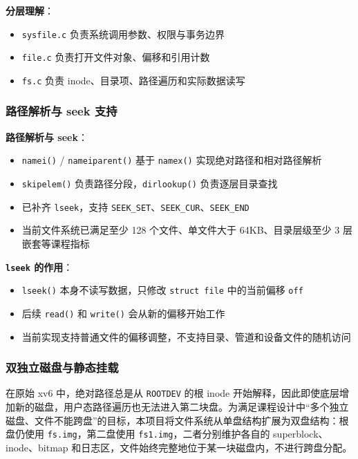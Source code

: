 \documentclass[12pt,a4paper]{ctexart}
\begin{document}
\textbf{分层理解}：
\begin{itemize}
  \item \texttt{sysfile.c} 负责系统调用参数、权限与事务边界
  \item \texttt{file.c} 负责打开文件对象、偏移和引用计数
  \item \texttt{fs.c} 负责 inode、目录项、路径遍历和实际数据读写
\end{itemize}

\subsubsection{路径解析与 seek 支持}

\textbf{路径解析与 seek}：
\begin{itemize}
  \item \texttt{namei()} / \texttt{nameiparent()} 基于 \texttt{namex()} 实现绝对路径和相对路径解析
  \item \texttt{skipelem()} 负责路径分段，\texttt{dirlookup()} 负责逐层目录查找
  \item 已补齐 \texttt{lseek}，支持 \texttt{SEEK\_SET}、\texttt{SEEK\_CUR}、\texttt{SEEK\_END}
  \item 当前文件系统已满足至少 128 个文件、单文件大于 64KB、目录层级至少 3 层嵌套等课程指标
\end{itemize}

\textbf{\texttt{lseek} 的作用}：
\begin{itemize}
  \item \texttt{lseek()} 本身不读写数据，只修改 \texttt{struct file} 中的当前偏移 \texttt{off}
  \item 后续 \texttt{read()} 和 \texttt{write()} 会从新的偏移开始工作
  \item 当前实现支持普通文件的偏移调整，不支持目录、管道和设备文件的随机访问
\end{itemize}

\subsubsection{双独立磁盘与静态挂载}

在原始 xv6 中，绝对路径总是从 \texttt{ROOTDEV} 的根 inode 开始解释，因此即使底层增加新的磁盘，用户态路径遍历也无法进入第二块盘。为满足课程设计中“多个独立磁盘、文件不能跨盘”的目标，本项目将文件系统从单盘结构扩展为双盘结构：根盘仍使用 \texttt{fs.img}，第二盘使用 \texttt{fs1.img}，二者分别维护各自的 superblock、inode、bitmap 和日志区，文件始终完整地位于某一块磁盘内，不进行跨盘分配。
\end{document}

